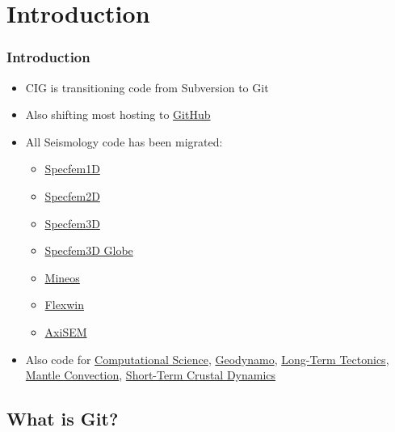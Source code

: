 \section{Introduction}

\begin{frame}
 \frametitle{Introduction}

 \begin{itemize}
  \item CIG is transitioning code from Subversion to Git
  \item Also shifting most hosting to \href{https://github.com/}{GitHub}
  \item All Seismology code has been migrated:
   \begin{itemize}
    \item \href{https://github.com/geodynamics/specfem1d}{Specfem1D}
    \item \href{https://github.com/geodynamics/specfem2d}{Specfem2D}
    \item \href{https://github.com/geodynamics/specfem3d}{Specfem3D}
    \item \href{https://github.com/geodynamics/specfem3d_globe}{Specfem3D Globe}
    \item \href{https://github.com/geodynamics/mineos}{Mineos}
    \item \href{https://github.com/geodynamics/flexwin}{Flexwin}
    \item \href{https://github.com/geodynamics/axisem}{AxiSEM}
   \end{itemize}
  \item Also code for
        \href{http://geodynamics.org/cig/software/\#cs}{Computational Science},
        \href{http://geodynamics.org/cig/software/\#geodyn}{Geodynamo},
        \href{http://geodynamics.org/cig/software/\#long}{Long-Term Tectonics},
        \href{http://geodynamics.org/cig/software/\#mc}{Mantle Convection},
        \href{http://geodynamics.org/cig/software/\#short}{Short-Term Crustal
        Dynamics}
 \end{itemize}
\end{frame}

\subsection{What is Git?}


